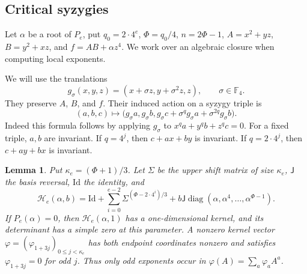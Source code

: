 \documentclass[11pt,a4paper,reqno]{amsart}
\numberwithin{equation}{section}
\theoremstyle{plain}
\newtheorem{lemma}[theorem]{Lemma}
\theoremstyle{definition}
\theoremstyle{remark}
\newcommand{\Id}{\mathrm{Id}}
\DeclareMathOperator{\diag}{diag}
\begin{document}
\subsection{Critical syzygies}
Let $\alpha$ be a root of $P_e$, put $q_0=2\cdot4^e$, $\Phi=q_0/4$,
$n=2\Phi-1$, $A=x^2+yz$, $B=y^2+xz$, and $f=AB+\alpha z^4$.
We work over an algebraic closure when computing local exponents.

We will use the translations
\[
g_\sigma(x,y,z)=(x+\sigma z,y+\sigma^2z,z),
\qquad \sigma\in\mathbb F_4.
\]
They preserve $A$, $B$, and $f$. Their induced action on a syzygy triple is
\[
(a,b,c)\longmapsto
\bigl(g_\sigma a,g_\sigma b,
g_\sigma c+\sigma^q g_\sigma a+\sigma^{2q}g_\sigma b\bigr).
\]
Indeed this formula follows by applying $g_\sigma$ to
$x^qa+y^qb+z^qc=0$.
For a fixed triple, $a,b$ are invariant. If $q=4^j$, then
$c+ax+by$ is invariant. If $q=2\cdot4^j$, then $c+ay+bx$ is invariant.
\begin{lemma}\label{lem:pade}
Put $\kappa_e=(\Phi+1)/3$. Let $\Sigma$ be the upper shift matrix of size $\kappa_e$,
$\mathsf J$ the basis reversal, $\Id$ the identity, and
\[
\mathcal H_e(\alpha,b)=\Id+\sum_{i=0}^{e-2}\Sigma^{(\Phi-2\cdot4^i)/3}
+b\mathsf J\diag(\alpha,\alpha^4,\ldots,\alpha^{\Phi-1}).
\]
If $P_e(\alpha)=0$, then $\mathcal H_e(\alpha,1)$ has a
one-dimensional kernel, and its determinant has a simple zero at
this parameter. A nonzero kernel vector
$\varphi=(\varphi_{1+3j})_{0\leq j<\kappa_e}$ has both endpoint
coordinates nonzero and satisfies $\varphi_{1+3j}=0$ for odd $j$.
Thus only odd exponents occur in
$\varphi(A)=\sum_a\varphi_aA^a$.
\end{lemma}
\end{document}
